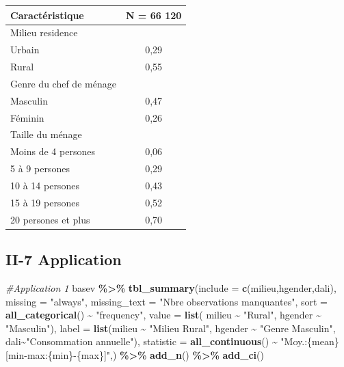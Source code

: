\documentclass[
]{article}
\newenvironment{Shaded}{\begin{snugshade}}{\end{snugshade}}
\newcommand{\AttributeTok}[1]{\textcolor[rgb]{0.13,0.29,0.53}{#1}}
\newcommand{\CommentTok}[1]{\textcolor[rgb]{0.56,0.35,0.01}{\textit{#1}}}
\newcommand{\FunctionTok}[1]{\textcolor[rgb]{0.13,0.29,0.53}{\textbf{#1}}}
\newcommand{\NormalTok}[1]{#1}
\newcommand{\SpecialCharTok}[1]{\textcolor[rgb]{0.81,0.36,0.00}{\textbf{#1}}}
\newcommand{\StringTok}[1]{\textcolor[rgb]{0.31,0.60,0.02}{#1}}
\begin{document}
\begin{longtable}[]{@{}lc@{}}
\toprule\noalign{}
\textbf{Caractéristique} & \textbf{N = 66 120} \\
\midrule\noalign{}
\endhead
\bottomrule\noalign{}
\endlastfoot
Milieu residence & \\
Urbain & 0,29 \\
Rural & 0,55 \\
Genre du chef de ménage & \\
Masculin & 0,47 \\
Féminin & 0,26 \\
Taille du ménage & \\
Moins de 4 persones & 0,06 \\
5 à 9 persones & 0,29 \\
10 à 14 persones & 0,43 \\
15 à 19 persones & 0,52 \\
20 persones et plus & 0,70 \\
\end{longtable}

\hypertarget{ii-7-application}{%
\subsection{II-7 Application}\label{ii-7-application}}

\begin{Shaded}
\begin{Highlighting}[]
\CommentTok{\#Application 1}
\NormalTok{basev }\SpecialCharTok{\%\textgreater{}\%}
  \FunctionTok{tbl\_summary}\NormalTok{(}\AttributeTok{include =} \FunctionTok{c}\NormalTok{(milieu,hgender,dali), }
              \AttributeTok{missing =} \StringTok{"always"}\NormalTok{,}
              \AttributeTok{missing\_text =} \StringTok{"Nbre observations manquantes"}\NormalTok{,}
              \AttributeTok{sort =} \FunctionTok{all\_categorical}\NormalTok{() }\SpecialCharTok{\textasciitilde{}} \StringTok{"frequency"}\NormalTok{,}
              \AttributeTok{value =} \FunctionTok{list}\NormalTok{( milieu }\SpecialCharTok{\textasciitilde{}} \StringTok{"Rural"}\NormalTok{, hgender }\SpecialCharTok{\textasciitilde{}} \StringTok{"Masculin"}\NormalTok{),}
              \AttributeTok{label =} \FunctionTok{list}\NormalTok{(milieu }\SpecialCharTok{\textasciitilde{}} \StringTok{"Milieu Rural"}\NormalTok{,}
\NormalTok{                           hgender }\SpecialCharTok{\textasciitilde{}} \StringTok{"Genre Masculin"}\NormalTok{,}
\NormalTok{                           dali}\SpecialCharTok{\textasciitilde{}}\StringTok{"Consommation annuelle"}\NormalTok{),}
              \AttributeTok{statistic =} \FunctionTok{all\_continuous}\NormalTok{() }\SpecialCharTok{\textasciitilde{}} 
                \StringTok{"Moy.:\{mean\}[min{-}max:\{min\}{-}\{max\}]"}\NormalTok{,) }\SpecialCharTok{\%\textgreater{}\%}
              \FunctionTok{add\_n}\NormalTok{()  }\SpecialCharTok{\%\textgreater{}\%}
              \FunctionTok{add\_ci}\NormalTok{() }
\end{Highlighting}
\end{Shaded}
\end{document}
